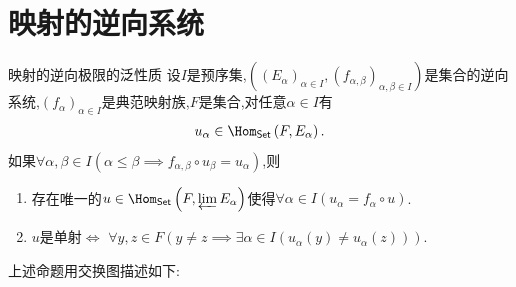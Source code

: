 \section{映射的逆向系统}

\begin{proposition}{映射的逆向极限的泛性质}{}
	设$I$是预序集,$\left(\left(E_{\alpha}\right)_{\alpha\in I},\left(f_{\alpha,\beta}\right)_{\alpha,\beta\in I}\right)$是集合的逆向系统,$\left(f_{\alpha}\right)_{\alpha\in I}$是典范映射族,$F$是集合,对任意$\alpha\in I$有
	\begin{align*}
		u_{\alpha}\in\Hom_{\mathsf{Set}}\left(F,E_{\alpha}\right).
	\end{align*}
	如果$\forall\alpha,\beta\in I\left(\alpha\leq\beta\implies f_{\alpha,\beta}\circ u_{\beta}=u_{\alpha}\right)$,则
	\begin{enumerate}
		\item 存在唯一的$u\in\Hom_{\mathsf{Set}}\left(F,\varprojlim E_{\alpha}\right)$使得$\forall\alpha\in I\left(u_{\alpha}=f_{\alpha}\circ u\right)$.
		\item $u$是单射$\iff$ $\forall y,z\in F\left(y\neq z\implies\exists\alpha\in I\left(u_{\alpha}\left(y\right)\neq u_{\alpha}\left(z\right)\right)\right)$.
	\end{enumerate}
\end{proposition}

上述命题用交换图描述如下:
\begin{center}
\end{center}

